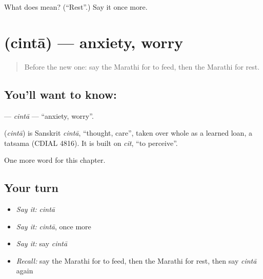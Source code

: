 \begin{tcolorbox}[breakable,colback=teal!4,colframe=teal!35!black,title={Before you move on}]
What does  mean? (\textquotedblleft{}Rest\textquotedblright{}.) Say it once more.
\end{tcolorbox}
\section[\texorpdfstring{\mr{चिंता} (cintā)}{चिंता (cintā)}]{ (cintā) — anxiety, worry}

\label{lesson:MR-C257-cinta}



\begin{quote}
Before the new one: say the Marathi for to feed, then the Marathi for rest.
\end{quote}

\subsection*{You'll want to know: }
\textbf{} — \emph{cintā} — \textquotedblleft{}anxiety, worry\textquotedblright{}.

\begin{cousinweb}
\textbf{} (\emph{cintā}) is Sanskrit \emph{cintā}, \textquotedblleft{}thought, care\textquotedblright{}, taken over whole as a learned loan, a tatsama (CDIAL 4816). It is built on \emph{cit}, \textquotedblleft{}to perceive\textquotedblright{}.
\end{cousinweb}

\begin{grammarlens}[title={What you've built}]
One more word for this chapter.
\end{grammarlens}

\subsection*{Your turn}
\begin{itemize}
\raggedright
  \item \emph{Say it:} \emph{cintā}
  \item \emph{Say it:} \emph{cintā}, once more
  \item \emph{Say it:} say \emph{cintā}
  \item \emph{Recall:} say the Marathi for to feed, then the Marathi for rest, then say \emph{cintā} again
\end{itemize}

